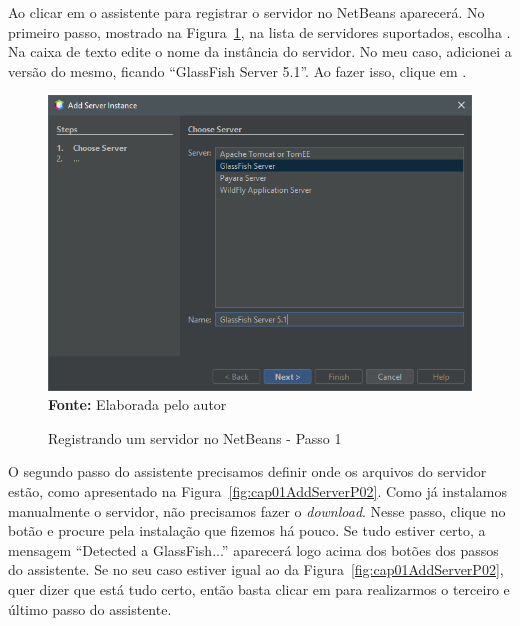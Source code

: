 Ao clicar em  o assistente para registrar o servidor no NetBeans aparecerá. No primeiro passo, mostrado na Figura~\ref{fig:cap01AddServerP01}, na lista de servidores suportados, escolha . Na caixa de texto  edite o nome da instância do servidor. No meu caso, adicionei a versão do mesmo, ficando ``GlassFish Server 5.1''. Ao fazer isso, clique em .

\FloatBarrier
\begin{figure}[!htbp]
    \centering
    \caption{Registrando um servidor no NetBeans - Passo 1}
    \includegraphics[scale=0.7]{imagens/cap01AddServerInstanceP01}
    \\\textbf{Fonte:} Elaborada pelo autor
    \label{fig:cap01AddServerP01}
\end{figure}
\FloatBarrier

O segundo passo do assistente precisamos definir onde os arquivos do servidor estão, como apresentado na Figura~\ref{fig:cap01AddServerP02}. Como já instalamos manualmente o servidor, não precisamos fazer o \textit{download}. Nesse passo, clique no botão  e procure pela instalação que fizemos há pouco. Se tudo estiver certo, a mensagem ``Detected a GlassFish...'' aparecerá logo acima dos botões dos passos do assistente. Se no seu caso estiver igual ao da Figura~\ref{fig:cap01AddServerP02}, quer dizer que está tudo certo, então basta clicar em  para realizarmos o terceiro e último passo do assistente.


